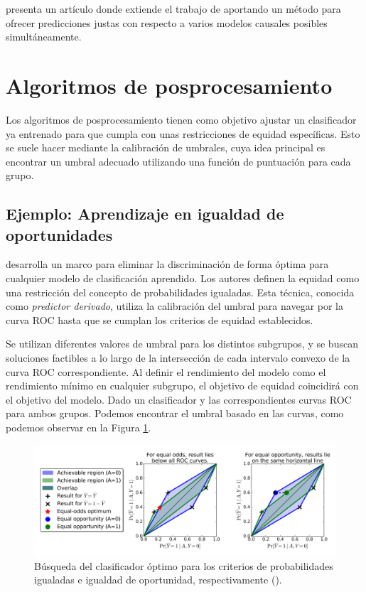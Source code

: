 \documentclass[oneside,openright,titlepage,numbers=noenddot,openany,headinclude,footinclude=true,
cleardoublepage=empty,abstractoff,BCOR=5mm,paper=a4,fontsize=12pt,main=spanish]{scrreprt}
\begin{document}
\cite{worlds2017} presenta un artículo donde extiende el trabajo de \cite{counterfactual2018} aportando un método para ofrecer predicciones justas con respecto a varios modelos causales posibles simultáneamente.

\section{Algoritmos de posprocesamiento}

Los algoritmos de posprocesamiento tienen como objetivo ajustar un clasificador ya entrenado para que cumpla con unas restricciones de equidad específicas. Esto se suele hacer mediante la calibración de umbrales, cuya idea principal es encontrar un umbral adecuado utilizando una función de puntuación para cada grupo.

\subsection{Ejemplo: Aprendizaje en igualdad de oportunidades}

\cite{eodd2016} desarrolla un marco para eliminar la discriminación de forma óptima para cualquier modelo de clasificación aprendido. Los autores definen la equidad como una restricción del concepto de probabilidades igualadas. Esta técnica, conocida como \textit{predictor derivado}, utiliza la calibración del umbral para navegar por la curva ROC hasta que se cumplan los criterios de equidad establecidos. 

Se utilizan diferentes valores de umbral para los distintos subgrupos, y se buscan soluciones factibles a lo largo de la intersección de cada intervalo convexo de la curva ROC correspondiente. Al definir el rendimiento del modelo como el rendimiento mínimo en cualquier subgrupo, el objetivo de equidad coincidirá con el objetivo del modelo. Dado un clasificador y las correspondientes curvas ROC para ambos grupos. Podemos encontrar el umbral basado en las curvas, como podemos observar en la Figura \ref{fig:posprocessing}.

\clearpage

\begin{figure}[h]
	\centering
	\includegraphics[width=15.0cm]{posexample.png}
	\caption{Búsqueda del clasificador óptimo para los criterios de probabilidades igualadas e igualdad de oportunidad, respectivamente (\cite{eodd2016}).}
    \label{fig:posprocessing}
\end{figure}
\end{document}
